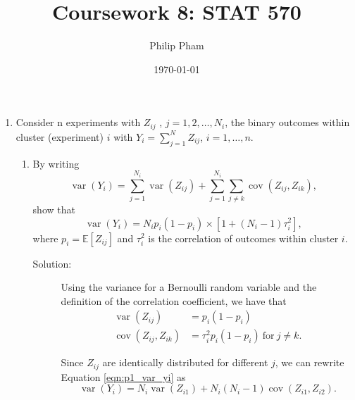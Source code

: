 \documentclass[letterpaper,11pt]{article}
\title{Coursework 8: STAT 570}
\author{Philip Pham}
\date{\today}
\begin{document}
\maketitle
\begin{enumerate}
\item Consider n experiments with $Z_{ij}$ , $j = 1,2,\ldots, N_i$, the binary
  outcomes within cluster (experiment) $i$ with $Y_i = \sum^N_{j=1} Z_{ij}$,
  $i = 1,\ldots,n$.
  \begin{enumerate}
  \item By writing
    \begin{equation}
      \operatorname{var}\left(Y_i\right)
      = \sum_{j=1}^{N_i} \operatorname{var}\left(Z_{ij}\right)
      + \sum_{j=1}^{N_i}\sum_{j \neq k} \operatorname{cov}\left(Z_{ij}, Z_{ik}\right),
      \label{eqn:p1_var_yi}
    \end{equation}
    show that
    \begin{equation}
      \operatorname{var}\left(Y_i\right)
      = N_ip_i\left(1 - p_i\right) \times
      \left[1 + \left(N_i - 1\right)\tau_i^2\right],
      \label{eqn:p1_var_yi_result}
    \end{equation}
    where $p_i = \mathbb{E}\left[Z_{ij}\right]$ and $\tau_i^2$ is the
    correlation of outcomes within cluster $i$.

    \begin{description}
    \item[Solution:] Using the variance for a Bernoulli random variable and the
      definition of the correlation coefficient, we have that
      \begin{align}
        \operatorname{var}\left(Z_{ij}\right)
        &= p_i\left(1 - p_i\right) \label{eqn:p1_var_cov}\\
        \operatorname{cov}\left(Z_{ij}, Z_{ik}\right)
        &= \tau_i^2p_i\left(1 - p_i\right)~\text{for}~j \neq k.
          \nonumber
      \end{align}
      
      Since $Z_{ij}$ are identically distributed for different $j$, we can
      rewrite Equation \ref{eqn:p1_var_yi} as
      \begin{equation}
        \operatorname{var}\left(Y_i\right)
        = N_i\operatorname{var}\left(Z_{i1}\right) +
        N_i\left(N_i - 1\right)\operatorname{cov}\left(Z_{i1},Z_{i2}\right).
        \label{eqn:p1_var_yi_simplified} 
      \end{equation}


\end{description}
\end{enumerate}
\end{enumerate}
\end{document}
